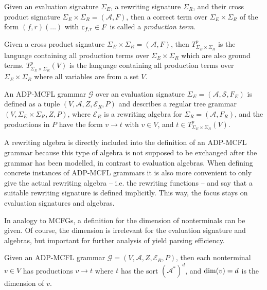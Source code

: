 \documentclass[
    a4paper,
    12pt,
    twoside,
    BCOR=12mm,
    parskip=half,
    chapterprefix,
    numbers=noenddot,
    bibliography=totoc
]{scrbook}
\begin{document}
\begin{definition}
	Given an evaluation signature $\Sigma_E$, a rewriting signature $\Sigma_R$, and their cross product signature $\Sigma_E \times \Sigma_R=(\mathcal{A},F)$, then a correct term over $\Sigma_E \times \Sigma_R$ of the form $(f,r)(\ldots)$ with $\mathrm{c}_{f,r} \in F$ is called a \emph{production term}.
\end{definition}

Given a cross product signature $\Sigma_E \times \Sigma_R=(\mathcal{A},F)$, then $T^p_{\Sigma_E \times \Sigma_R}$ is the language containing all production terms over $\Sigma_E \times \Sigma_R$ which are also ground terms. $T^p_{\Sigma_E \times \Sigma_R}(V)$ is the  language containing all production terms over $\Sigma_E \times \Sigma_R$ where all variables are from a set $V$.

\begin{definition}
	\label{def:mult_tree_grammar}
	An ADP-MCFL grammar $\mathcal{G}$ over an evaluation signature $\Sigma_E=(\mathcal{A},\mathcal{S},F_E)$ is defined as a tuple $(V,\mathcal{A},Z,\mathcal{E}_R,P)$ and describes a regular tree grammar $(V,\Sigma_E \times \Sigma_R,Z,P)$, where $\mathcal{E}_R$ is a rewriting algebra for $\Sigma_R=(\mathcal{A},F_R)$, and the productions in $P$ have the form $v \to t$ with $v \in V$, and $t \in T^p_{\Sigma_E \times \Sigma_R} (V)$.
\end{definition}

\begin{remark}
	A rewriting algebra is directly included into the definition of an ADP-MCFL grammar because this type of algebra is not supposed to be exchanged after the grammar has been modelled, in contrast to evaluation algebras. When defining concrete instances of ADP-MCFL grammars it is also more convenient to only give the actual rewriting algebra -- i.e. the rewriting functions -- and say that a suitable rewriting signature is defined implicitly. This way, the focus stays on evaluation signatures and algebras.
\end{remark}

In analogy to \glspl{MCFG}, a definition for the dimension of nonterminals can be given. Of course, the dimension is irrelevant for the evaluation signature and algebras, but important for further analysis of yield parsing efficiency.

\begin{definition}
	Given an ADP-MCFL grammar $\mathcal{G}=(V,\mathcal{A},Z,\mathcal{E}_R,P)$, then each nonterminal $v \in V$ has productions $v \to t$ where $t$ has the sort $(\mathcal{A}^*)^d$, and $\mathrm{dim}(v)=d$ is the dimension of $v$.
\end{definition}
\end{document}
